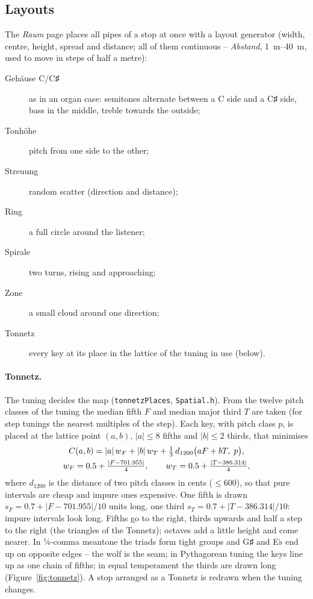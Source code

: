 \documentclass[11pt,a4paper,parskip=half,DIV=11,toc=bibliography]{scrartcl}
\newcommand{\ui}[1]{\emph{#1}}                 %
\newcommand{\fn}[1]{\mbox{\texttt{#1}}}
\begin{document}
\subsection{Layouts}
\label{sec:layouts}
The \ui{Raum} page places all pipes of a stop at once with a layout generator (width, centre, height,
spread and distance; all of them continuous -- \ui{Abstand}, \SIrange{1}{40}{m}, used to move in steps of half a metre):
\begin{description}
  \item[Gehäuse C/C♯] as in an organ case: semitones alternate between a C side and a C♯ side, bass in the
        middle, treble towards the outside;
  \item[Tonhöhe] pitch from one side to the other;
  \item[Streuung] random scatter (direction and distance);
  \item[Ring] a full circle around the listener;
  \item[Spirale] two turns, rising and approaching;
  \item[Zone] a small cloud around one direction;
  \item[Tonnetz] every key at its place in the lattice of the tuning in use (below).
\end{description}

\paragraph{Tonnetz.} The tuning decides the map (\fn{tonnetzPlaces}, \fn{Spatial.h}). From the twelve pitch classes of
the tuning the median fifth $F$ and median major third $T$ are taken (for step tunings the nearest multiples of the
step). Each key, with pitch class $p$, is placed at the lattice point $(a,b)$, $|a|\le8$ fifths and $|b|\le2$ thirds,
that minimises
\begin{gather}
  C(a,b)=|a|\,w_F+|b|\,w_T+\tfrac13\,d_{1200}\bigl(aF+bT,\;p\bigr),\\
  w_F=0.5+\tfrac{|F-701.955|}{4},\qquad w_T=0.5+\tfrac{|T-386.314|}{4},\notag
\end{gather}
where $d_{1200}$ is the distance of two pitch classes in cents ($\le600$),
so that pure intervals are cheap and impure ones expensive. One fifth is drawn
$s_F=0.7+|F-701.955|/10$ units long, one third $s_T=0.7+|T-386.314|/10$: impure intervals look long. Fifths go to the
right, thirds upwards and half a step to the right (the triangles of the Tonnetz); octaves add a little height and come
nearer. In ¼-comma meantone the triads form tight groups and G♯ and E♭ end up on opposite edges -- the wolf is the
seam; in Pythagorean tuning the keys line up as one chain of fifths; in equal temperament the thirds are drawn long
(Figure~\ref{fig:tonnetz}). A stop arranged as a Tonnetz is redrawn when the tuning changes.
\end{document}
